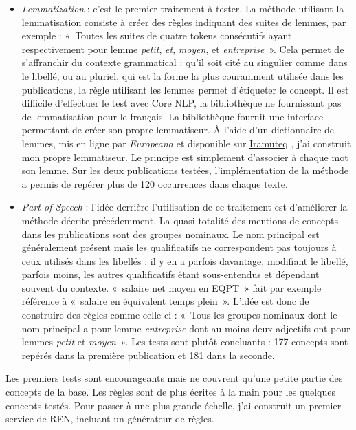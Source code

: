 \begin{itemize}
    \item \textit{Lemmatization} : c'est le premier traitement à tester. La méthode utilisant la lemmatisation consiste à créer des règles indiquant des suites de lemmes, par exemple : «~Toutes les suites de quatre tokens consécutifs ayant respectivement pour lemme \textit{petit}, \textit{et}, \textit{moyen}, et \textit{entreprise}~». Cela permet de s'affranchir du contexte grammatical : qu'il soit cité au singulier comme dans le libellé, ou au pluriel, qui est la forme la plus couramment utilisée dans les publications, la règle utilisant les lemmes permet d'étiqueter le concept. Il est difficile d'effectuer le test avec Core NLP, la bibliothèque ne fournissant pas de lemmatisation pour le français. La bibliothèque fournit une interface permettant de créer son propre lemmatiseur. À l'aide d'un dictionnaire de lemmes, mis en ligne par \textit{Europeana} et disponible sur \href{http://www.iramuteq.org/}{Iramuteq} \cite{iramuteq}, j'ai construit mon propre lemmatiseur. Le principe est simplement d'associer à chaque mot son lemme. Sur les deux publications testées, l'implémentation de la méthode a permis de repérer plus de 120 occurrences dans chaque texte.
    \newline
    
    \item \textit{Part-of-Speech} : l'idée derrière l'utilisation de ce traitement est d'améliorer la méthode décrite précédemment. La quasi-totalité des mentions de concepts dans les publications sont des groupes nominaux. Le nom principal est généralement présent mais les qualificatifs ne correspondent pas toujours à ceux utilisés dans les libellés : il y en a parfois davantage, modifiant le libellé, parfois moins, les autres qualificatifs étant sous-entendus et dépendant souvent du contexte. «~salaire net moyen en EQPT~» fait par exemple référence à «~salaire en équivalent temps plein~». L'idée est donc de construire des règles comme celle-ci : «~Tous les groupes nominaux dont le nom principal a pour lemme \textit{entreprise} dont au moins deux adjectifs ont pour lemmes \textit{petit} et \textit{moyen}~». Les tests sont plutôt concluants : 177 concepts sont repérés dans la première publication et 181 dans la seconde.
    \newline
\end{itemize}


Les premiers tests sont encourageants mais ne couvrent qu'une petite partie des concepts de la base. Les règles sont de plus écrites à la main pour les quelques concepts testés. Pour passer à une plus grande échelle, j'ai construit un premier service de REN, incluant un générateur de règles.
\label{section 2.2.4}

